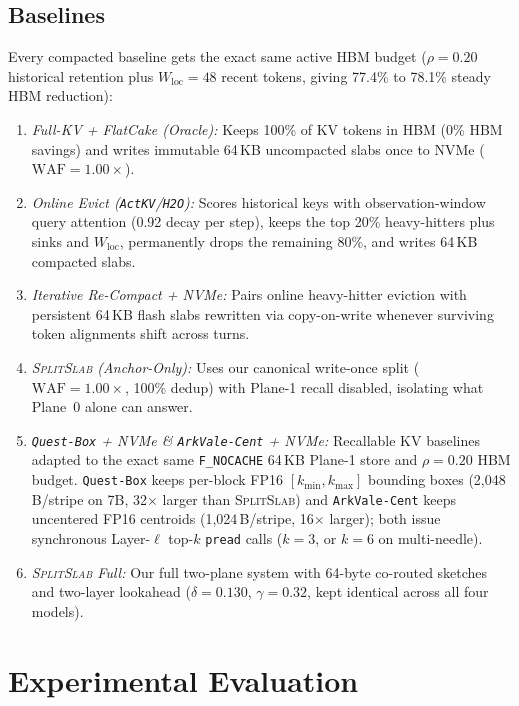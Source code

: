 \documentclass[pdflatex,sn-mathphys-num]{sn-jnl}
\theoremstyle{thmstyleone}
\newcommand{\SplitSlab}{\textsc{SplitSlab}}
\newcommand{\WAF}{\mathrm{WAF}}
\begin{document}
\subsection{Baselines}
Every compacted baseline gets the exact same active HBM budget ($\rho = 0.20$ historical retention plus $W_{\mathrm{loc}} = 48$ recent tokens, giving 77.4\% to 78.1\% steady HBM reduction):
\begin{enumerate}
  \item \emph{Full-KV + FlatCake (Oracle):} Keeps 100\% of KV tokens in HBM (0\% HBM savings) and writes immutable 64\,KB uncompacted slabs once to NVMe ($\WAF = 1.00\times$).
  \item \emph{Online Evict (\texttt{ActKV}/\texttt{H2O}):} Scores historical keys with observation-window query attention (0.92 decay per step), keeps the top 20\% heavy-hitters plus sinks and $W_{\mathrm{loc}}$, permanently drops the remaining 80\%, and writes 64\,KB compacted slabs.
  \item \emph{Iterative Re-Compact + NVMe:} Pairs online heavy-hitter eviction with persistent 64\,KB flash slabs rewritten via copy-on-write whenever surviving token alignments shift across turns.
  \item \emph{\SplitSlab{} (Anchor-Only):} Uses our canonical write-once split ($\WAF = 1.00\times$, 100\% dedup) with Plane-1 recall disabled, isolating what Plane~0 alone can answer.
  \item \emph{\texttt{Quest-Box} + NVMe \& \texttt{ArkVale-Cent} + NVMe:} Recallable KV baselines adapted to the exact same \texttt{F\_NOCACHE} 64\,KB Plane-1 store and $\rho = 0.20$ HBM budget. \texttt{Quest-Box} keeps per-block FP16 $[k_{\min}, k_{\max}]$ bounding boxes (2,048\,B/stripe on 7B, 32$\times$ larger than \SplitSlab{}) and \texttt{ArkVale-Cent} keeps uncentered FP16 centroids (1,024\,B/stripe, 16$\times$ larger); both issue synchronous Layer-$\ell$ top-$k$ \texttt{pread} calls ($k=3$, or $k=6$ on multi-needle).
  \item \emph{\SplitSlab{} Full:} Our full two-plane system with 64-byte co-routed sketches and two-layer lookahead ($\delta = 0.130$, $\gamma = 0.32$, kept identical across all four models).
\end{enumerate}

\section{Experimental Evaluation}\label{sec:eval}
\end{document}

